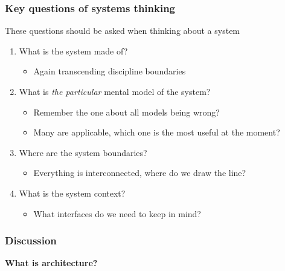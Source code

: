 \documentclass[10pt, compress]{beamer}
\begin{document}
\begin{frame}[fragile]
  \frametitle{Key questions of systems thinking}
	These questions should be asked when thinking about a system
		\begin{enumerate}
			\item What is the system made of?
			\begin{itemize}
				\item Again transcending discipline boundaries
			\end{itemize}
			\item What is \emph{the particular} mental model of the system?
			\begin{itemize}
				\item Remember the one about all models being wrong? 
				\item Many are applicable, which one is the most useful at the moment?
			\end{itemize}

			\item Where are the system boundaries?
			\begin{itemize}
				\item Everything is interconnected, where do we draw the line?
			\end{itemize}

			\item What is the system context?
			\begin{itemize}
				\item What interfaces do we need to keep in mind?
			\end{itemize}

		\end{enumerate}
\end{frame}



\begin{frame}[fragile]
  \frametitle{Discussion}
		\begin{center}
			\textbf{What is architecture?}
		\end{center}
\end{frame}
\end{document}
